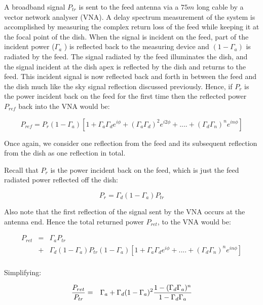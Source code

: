 \documentclass[12pt,preprint]{aastex}
\begin{document}
A broadband signal $P_{tr}$ is sent to the feed antenna via a $75m$ long cable by
a vector network analyser (VNA). A delay spectrum measurement of the system is
accomplished by measuring the complex return loss of the feed while keeping it at the
focal point of the dish.  When the signal is incident on the feed, part of the
incident power ($\Gamma_{a}$ ) is reflected back to the measuring device and
$(1-\Gamma_{a})$ is radiated by the feed. The signal radiated by the feed
illuminates the dish, and the signal incident at the dish apex is reflected by
the dish and returns to the feed. This incident signal is now reflected back
and forth in between the feed and the dish much like the sky signal reflection
discussed previously. Hence, if $P_{r}$ is the power incident back on the feed
for the first time then the reflected power $P_{ref}$ back into the VNA would
be:

\begin{equation}
P_{ref} =  P_{r}(1-\Gamma_{a}) [1+ \Gamma_{a}\Gamma_{d} e^{i\phi}+ (\Gamma_{a}\Gamma_{d})^2e^{i2\phi}+ ....+ (\Gamma_{d}\Gamma_{n})^{n}e^{in\phi}]
\end{equation}
 
Once again, we consider one reflection from the feed and its subsequent reflection from the dish as one reflection in total.

Recall that $P_{r}$ is the power incident back on the feed, which is just the feed radiated power reflected off the dish:
 
\begin{equation}
P_{r}= \Gamma_{d}(1-\Gamma_a) P_{tr}
\end{equation}

Also note that the first reflection of the signal sent by the VNA occurs at the antenna end. Hence the total returned power $P_{ret}$, to the VNA  would be:

\begin{eqnarray}
P_{ret} & = & \Gamma_{a}P_{tr} \nonumber\\ 
 & + &   \Gamma_{d}(1-\Gamma_a) P_{tr}(1-\Gamma_{a}) [1+ \Gamma_{a}\Gamma_{d} e^{i\phi}+  ....+ (\Gamma_{d}\Gamma_{n})^{n}e^{in\phi}]\nonumber\\
 \end{eqnarray}
 
Simplifying:
 
  \begin{eqnarray}
 {P_{ret} \over P_{tr} } & = & \Gamma_{a}
  +  \Gamma_{d}(1-\Gamma_a)^{2}  {1-(\Gamma_{d}\Gamma_{a})^{n} \over 1-\Gamma_{d} \Gamma_{a} } \nonumber\\
\end{eqnarray}
\end{document}
